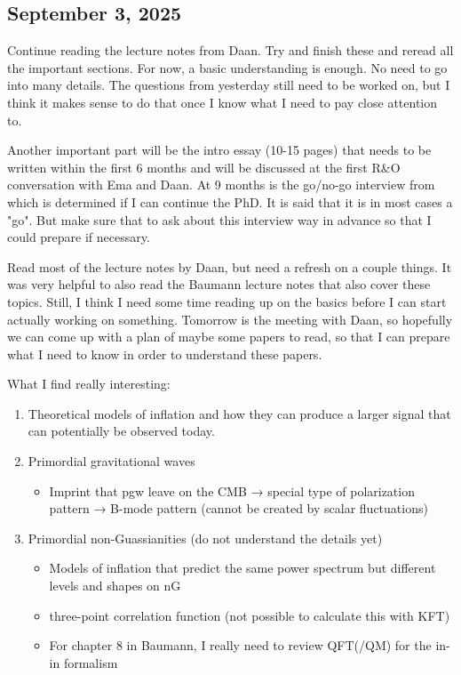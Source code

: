 \documentclass[12pt]{article}
\begin{document}
\subsection*{September 3, 2025}
Continue reading the lecture notes from Daan. Try and finish these and reread all the important sections. For now, a basic understanding is enough. No need to go into many details. The questions from yesterday still need to be worked on, but I think it makes sense to do that once I know what I need to pay close attention to. 

Another important part will be the intro essay (10-15 pages) that needs to be written within the first 6 months and will be discussed at the first R\&O conversation with Ema and Daan. At 9 months is the go/no-go interview from which is determined if I can continue the PhD. It is said that it is in most cases a "go". But make sure that to ask about this interview way in advance so that I could prepare if necessary. 

Read most of the lecture notes by Daan, but need a refresh on a couple things. It was very helpful to also read the Baumann lecture notes that also cover these topics. Still, I think I need some time reading up on the basics before I can start actually working on something. Tomorrow is the meeting with Daan, so hopefully we can come up with a plan of maybe some papers to read, so that I can prepare what I need to know in order to understand these papers. 

What I find really interesting:
\begin{enumerate}
    \item Theoretical models of inflation and how they can produce a larger signal that can potentially be observed today.
    \item Primordial gravitational waves
    \begin{itemize}
        \item Imprint that pgw leave on the CMB → special type of polarization pattern → B-mode pattern (cannot be created by scalar fluctuations)
    \end{itemize}
    \item Primordial non-Guassianities (do not understand the details yet)
    \begin{itemize}
        \item Models of inflation that predict the same power spectrum but different levels and shapes on nG
        \item three-point correlation function (not possible to calculate this with KFT)
        \item For chapter 8 in Baumann, I really need to review QFT(/QM) for the in-in formalism
    \end{itemize}
\end{enumerate}
\end{document}
